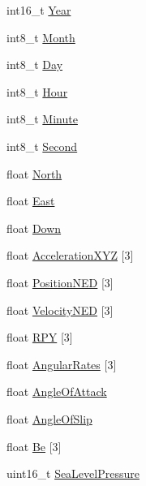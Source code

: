 \begin{DoxyCompactItemize}
int16\-\_\-t \hyperlink{struct____attribute_____a961fe0c9276282fc2d3ffdf8fa6e5d77}{\-Year}
\item 
int8\-\_\-t \hyperlink{struct____attribute_____a3cadf53d572a7df7445c6077008521fc}{\-Month}
\item 
int8\-\_\-t \hyperlink{struct____attribute_____ab1171623a435fb8bd37c7fe51343d534}{\-Day}
\item 
int8\-\_\-t \hyperlink{struct____attribute_____a55359118dfe602519ab7ee5a331c64a0}{\-Hour}
\item 
int8\-\_\-t \hyperlink{struct____attribute_____a8248d68e71037763d6f71a880154d0f5}{\-Minute}
\item 
int8\-\_\-t \hyperlink{struct____attribute_____ade1e5256a6912b5b3c34bc1892a2049b}{\-Second}
\item 
float \hyperlink{struct____attribute_____af07f085a1e47ef36bfc8cea372caa47b}{\-North}
\item 
float \hyperlink{struct____attribute_____a344a295af71bb400fd8a8ed79f82a00a}{\-East}
\item 
float \hyperlink{struct____attribute_____a7494f86dc4a5484037486740cc098800}{\-Down}
\item 
float \hyperlink{struct____attribute_____a78dadcd89df0be899c59a6aadb933e81}{\-Acceleration\-X\-Y\-Z} \mbox{[}3\mbox{]}
\item 
float \hyperlink{struct____attribute_____af9dbc11fe6701c405946bac04ad858b4}{\-Position\-N\-E\-D} \mbox{[}3\mbox{]}
\item 
float \hyperlink{struct____attribute_____ae017d52e534be49fcd02a71e636e359e}{\-Velocity\-N\-E\-D} \mbox{[}3\mbox{]}
\item 
float \hyperlink{struct____attribute_____a553b2fa7b8c12434cac736e4fd163505}{\-R\-P\-Y} \mbox{[}3\mbox{]}
\item 
float \hyperlink{struct____attribute_____acb1d79cf5cda5ce006ba0440e19ce509}{\-Angular\-Rates} \mbox{[}3\mbox{]}
\item 
float \hyperlink{struct____attribute_____a21d58f5dc6c63e6492e39a70a6b11eee}{\-Angle\-Of\-Attack}
\item 
float \hyperlink{struct____attribute_____a2bf77984a5026b4bc33cd3dcdbdd6a18}{\-Angle\-Of\-Slip}
\item 
float \hyperlink{struct____attribute_____ab887c9b6aa59638e83e79afd7379ce48}{\-Be} \mbox{[}3\mbox{]}
\item 
uint16\-\_\-t \hyperlink{struct____attribute_____a87e877a9d87bf2748f3d028f6d28bd91}{\-Sea\-Level\-Pressure}
\item 

\end{DoxyCompactItemize}

